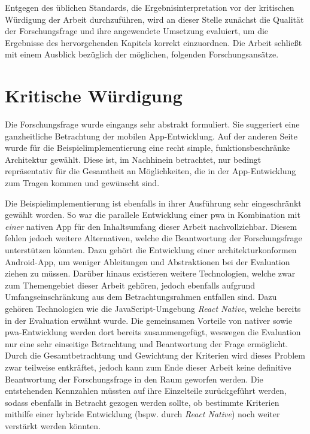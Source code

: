 Entgegen des üblichen Standards, die Ergebnisinterpretation vor der kritischen Würdigung der Arbeit durchzuführen, wird an dieser Stelle zunächst die Qualität der Forschungsfrage und ihre angewendete Umsetzung evaluiert, um die Ergebnisse des hervorgehenden Kapitels korrekt einzuordnen. Die Arbeit schließt mit einem Ausblick bezüglich der möglichen, folgenden Forschungsansätze.

\section{Kritische Würdigung}
Die Forschungsfrage wurde eingangs sehr abstrakt formuliert. Sie suggeriert eine ganzheitliche Betrachtung der mobilen App-Entwicklung. Auf der anderen Seite wurde für die Beispielimplementierung eine recht simple, funktionsbeschränke Architektur gewählt. Diese ist, im Nachhinein betrachtet, nur bedingt repräsentativ für die Gesamtheit an Möglichkeiten, die in der App-Entwicklung zum Tragen kommen und gewünscht sind.

Die Beispielimplementierung ist ebenfalls in ihrer Ausführung sehr eingeschränkt gewählt worden. So war die parallele Entwicklung einer \ac{pwa} in Kombination mit \textit{einer} nativen App für den Inhaltsumfang dieser Arbeit nachvollziehbar. Diesem fehlen jedoch weitere Alternativen, welche die Beantwortung der Forschungsfrage unterstützen könnten. Dazu gehört die Entwicklung einer architekturkonformen Android-App, um weniger Ableitungen und Abstraktionen bei der Evaluation ziehen zu müssen. Darüber hinaus existieren weitere Technologien, welche zwar zum Themengebiet dieser Arbeit gehören, jedoch ebenfalls aufgrund Umfangseinschränkung aus dem Betrachtungsrahmen entfallen sind. Dazu gehören Technologien wie die JavaScript-Umgebung \textit{React Native}, welche bereits in der Evaluation erwähnt wurde. Die gemeinsamen Vorteile von nativer sowie \ac{pwa}-Entwicklung werden dort bereits zusammengefügt, weswegen die Evaluation nur eine sehr einseitige Betrachtung und Beantwortung der Frage ermöglicht. Durch die Gesamtbetrachtung und Gewichtung der Kriterien wird dieses Problem zwar teilweise entkräftet, jedoch kann zum Ende dieser Arbeit keine definitive Beantwortung der Forschungsfrage in den Raum geworfen werden. Die entstehenden Kennzahlen müssten auf ihre Einzelteile zurückgeführt werden, sodass ebenfalls in Betracht gezogen werden sollte, ob bestimmte Kriterien mithilfe einer hybride Entwicklung (bspw. durch \textit{React Native}) noch weiter verstärkt werden könnten.

